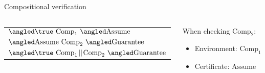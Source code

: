 \documentclass[../talk.tex]{subfiles}
\begin{document}
\begin{frame}{Compositional verification}
\begin{overlayarea}{\slidewidth}{\slideheight}
{{                    \begin{columns}[T]
                                \begin{column}{0.6\textwidth}
                                        {%
                                            \begin{tabular}{l}
                                                $\relyguarantee{\true}{\text{Comp}_1}{\text{Assume}}$
                                                \\
                                                $\relyguarantee{\text{Assume}}{\text{Comp}_2}{\text{Guarantee}}$
                                                \\
                                                \cline{1-1}
                                                $\relyguarantee{\true}{\text{Comp}_1 \!\mid\mid\! \text{Comp}_2 }{\text{Guarantee}}$
                                                \\
                                            \end{tabular}
                                    }
                                \end{column}
                                {%
                                    \begin{column}{0.4\textwidth}
                                        When checking $\text{Comp}_2$:
                                        \begin{itemize}
                                            \item[] \alert{Environment}: $\text{Comp}_1$
                                            \item[] \alert{Certificate}: $\text{Assume}$
                                        \end{itemize}
                                    \end{column}
                                }
                            \end{columns}

                }
            }
    \end{overlayarea}
\end{frame}
\end{document}

